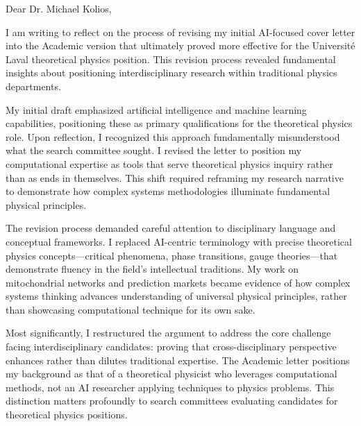 Dear Dr. Michael Kolios,
\vspace{1.0em}

\hspace{1.5em} I am writing to reflect on the process of revising my initial AI-focused cover letter into the Academic version that ultimately proved more effective for the Université Laval theoretical physics position. This revision process revealed fundamental insights about positioning interdisciplinary research within traditional physics departments.
\vspace{1.0em}

\hspace{1.5em} My initial draft emphasized artificial intelligence and machine learning capabilities, positioning these as primary qualifications for the theoretical physics role. Upon reflection, I recognized this approach fundamentally misunderstood what the search committee sought. I revised the letter to position my computational expertise as tools that serve theoretical physics inquiry rather than as ends in themselves. This shift required reframing my research narrative to demonstrate how complex systems methodologies illuminate fundamental physical principles.
\vspace{1.0em}

\hspace{1.5em} The revision process demanded careful attention to disciplinary language and conceptual frameworks. I replaced AI-centric terminology with precise theoretical physics concepts—critical phenomena, phase transitions, gauge theories—that demonstrate fluency in the field's intellectual traditions. My work on mitochondrial networks and prediction markets became evidence of how complex systems thinking advances understanding of universal physical principles, rather than showcasing computational technique for its own sake.
\vspace{1.0em}

\hspace{1.5em} Most significantly, I restructured the argument to address the core challenge facing interdisciplinary candidates: proving that cross-disciplinary perspective enhances rather than dilutes traditional expertise. The Academic letter positions my background as that of a theoretical physicist who leverages computational methods, not an AI researcher applying techniques to physics problems. This distinction matters profoundly to search committees evaluating candidates for theoretical physics positions.
\vspace{1.0em}

